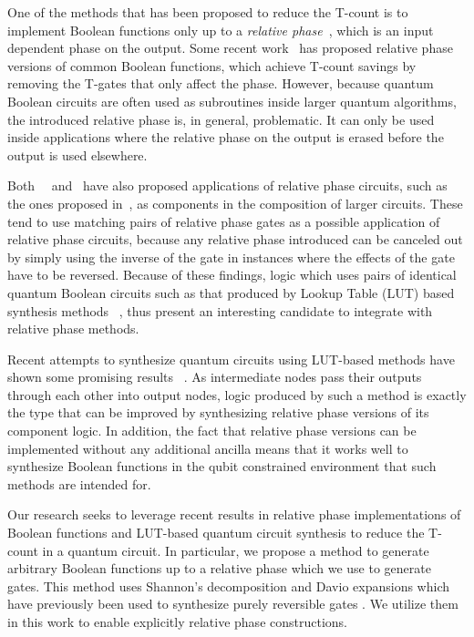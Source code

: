 One of the methods that has been proposed to reduce the T-count is to implement Boolean functions only
up to a {\it relative phase}~\cite{bib-barenco-elementary}, which is an input dependent phase on the
output. Some recent work~\cite{bib-rtof-maslov,bib-selinger-rtof,bib-amy-phase-state} has proposed
relative phase versions of common Boolean functions, which achieve T-count savings by removing the
T-gates that only affect the phase. However, because quantum Boolean circuits are often used as
subroutines inside larger quantum algorithms, the introduced relative phase is, in general, problematic.
It can only be used inside applications where the relative phase on the output is erased before the
output is used elsewhere.

Both ~\cite{bib-rtof-maslov}~and~\cite{bib-amy-phase-state} have also proposed applications of relative
phase circuits, such as the ones proposed in~\cite{bib-selinger-rtof}, as components in the composition
of larger circuits. 
These tend to use matching pairs of relative phase gates as a possible application of relative phase 
circuits, because any relative phase introduced can be canceled out by simply using the inverse of the
gate in instances where the effects of the gate have to be reversed. Because of these findings,
logic which uses pairs of identical quantum Boolean circuits such as that produced by
Lookup Table (LUT) based synthesis methods ~\cite{bib-lhrs-soeken}, thus present an interesting
candidate to integrate with relative phase methods.

Recent attempts to synthesize quantum circuits using LUT-based methods have shown some promising results
~\cite{bib-lhrs-soeken}. As intermediate nodes pass their outputs through each other into output nodes, logic produced
by such a method is exactly the type that can be improved by synthesizing relative phase versions of its
component logic. In addition, the fact that relative phase versions can be implemented without any additional
ancilla means that it works well to synthesize Boolean functions in the qubit constrained environment that
such methods are intended for. 

Our research seeks to leverage recent results in relative phase implementations of Boolean functions and
LUT-based quantum circuit synthesis to reduce the T-count in a quantum circuit. In particular, we propose
a method to generate arbitrary Boolean functions up to a relative phase which we use to generate gates.
This method uses Shannon's decomposition and Davio expansions which have previously been used to synthesize
purely reversible gates \cite{bib-pkrm}. We utilize them in this work to enable explicitly relative phase
constructions.

